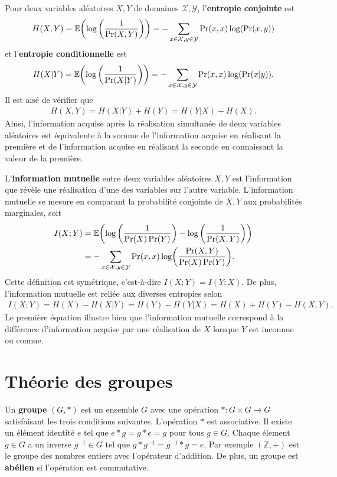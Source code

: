 Pour deux variables aléatoires $X, Y$ de domaines $\mathcal X, \mathcal Y$,
l'\textbf{entropie conjointe} est 
\begin{align}
  H(X, Y) 
  = \mathbb E\qty(\log\qty(\frac{1}{\Pr(X, Y)})) 
  = -\sum_{x\in\mathcal X, y \in\mathcal Y}\Pr(x, x) \log(\Pr(x, y))
\end{align}
et l'\textbf{entropie conditionnelle} est
\begin{align}
  H(X | Y) 
  = \mathbb E\qty(\log\qty(\frac{1}{\Pr(X|Y)})) 
  = -\sum_{x\in\mathcal X, y \in\mathcal Y}\Pr(x, x) \log(\Pr(x|y)).
\end{align}
Il est aisé de vérifier que 
\begin{align}
  H(X, Y) = H(X | Y) + H(Y) = H(Y | X) + H(X).
\end{align}
Ainsi,
l'information acquise après la réalisation simultanée de deux variables aléatoires
est équivalente à la somme de l'information acquise en réalisant la première 
et de l'information acquise en réalisant la seconde en connaissant la valeur de la première.

L'\textbf{information mutuelle} entre deux variables aléatoires $X, Y$ est
l'information que révèle une réalisation d'une des variables sur l'autre variable.
L'information mutuelle se mesure en comparant la probabilité conjointe de $X, Y$
aux probabilités marginales, soit
\begin{align}
  I(X ; Y) 
  &= \mathbb E\qty(
    \log\qty(\frac{1}{\Pr(X)\Pr(Y)})
    -
    \log\qty(\frac{1}{\Pr(X, Y)})
  ) \notag \\
  &= -\sum_{x\in\mathcal X, y \in\mathcal Y}\Pr(x, x) \log(\frac{\Pr(X, Y)}{\Pr(X)\Pr(Y)}).
\end{align}
Cette définition est symétrique,
c'est-à-dire $I(X ; Y) = I(Y ; X)$.
De plus,
l'information mutuelle est reliée aux diverses entropies selon
\begin{align}
  I(X;Y)
  = H(X) - H(X | Y)
  = H(Y) - H(Y | X)
  = H(X) + H(Y) - H(X, Y).
\end{align}
Le première équation illustre bien que l'information mutuelle correspond à la différence
d'information acquise par une réalisation de $X$ lorsque $Y$ est inconnue ou connue.


\chapter{Théorie des groupes}
\label{chap:theo_groupes}

Un \textbf{groupe} $(G, *)$ est un ensemble $G$ avec une opération $* : G \times G \to G$
satisfaisant les trois conditions suivantes.
L'opération $*$ est associative.
Il existe un élément identité $e$ tel que $e * g = g * e = g$ pour tous $g \in G$.
Chaque élement $g \in G$ a un inverse $g^{-1} \in G$ tel que $g * g^{-1} = g^{-1} * g = e$.
Par exemple $(\mathbb Z, +)$ est le groupe des nombres entiers avec l'opérateur d'addition.
De plus, un groupe est \textbf{abélien} si l'opération est commutative.

